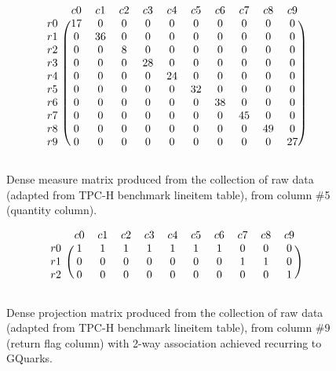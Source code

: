 

  \begin{figure}[H]
    \centering
    \caption{Dense measure matrix produced from the collection of raw data (adapted from TPC-H benchmark lineitem table), from column \#5 (quantity column).}
\[
\begin{blockarray}{ccccccccccc}
	&	c0	&	c1	&	c2	&	c3	&	c4	&	c5	&	c6	&	c7	&	c8	&	c9	\\
\begin{block}{c(cccccccccc)}
r0	&	17	&	0	&	0	&	0	&	0	&	0	&	0	&	0	&	0	&	0	\\
r1	&	0	&	36	&	0	&	0	&	0	&	0	&	0	&	0	&	0	&	0	\\
r2	&	0	&	0	&	8	&	0	&	0	&	0	&	0	&	0	&	0	&	0	\\
r3	&	0	&	0	&	0	&	28	&	0	&	0	&	0	&	0	&	0	&	0	\\
r4	&	0	&	0	&	0	&	0	&	24	&	0	&	0	&	0	&	0	&	0	\\
r5	&	0	&	0	&	0	&	0	&	0	&	32	&	0	&	0	&	0	&	0	\\
r6	&	0	&	0	&	0	&	0	&	0	&	0	&	38	&	0	&	0	&	0	\\
r7	&	0	&	0	&	0	&	0	&	0	&	0	&	0	&	45	&	0	&	0	\\
r8	&	0	&	0	&	0	&	0	&	0	&	0	&	0	&	0	&	49	&	0	\\
r9	&	0	&	0	&	0	&	0	&	0	&	0	&	0	&	0	&	0	&	27	\\
\end{block}
\end{blockarray}
 \]
    \label{fig:example_matrix_5}
    \end{figure}
        
\begin{figure}[H]
\centering
\caption{Dense projection matrix produced from the collection of raw data (adapted from TPC-H benchmark lineitem table), from column \#9 (return flag column) with 2-way association achieved recurring to GQuarks.}
\[
\begin{blockarray}{ccccccccccc}
	&	c0	&	c1	&	c2	&	c3	&	c4	&	c5	&	c6	&	c7	&	c8	&	c9	\\
\begin{block}{c(cccccccccc)}
r0	&	1	&	1	&	1	&	1	&	1	&	1	&	1	&	0	&	0	&	0	\\
r1	&	0	&	0	&	0	&	0	&	0	&	0	&	0	&	1	&	1	&	0	\\
r2	&	0	&	0	&	0	&	0	&	0	&	0	&	0	&	0	&	0	&	1	\\
\end{block}
\end{blockarray}
\]
    \label{fig:example_matrix_9}
\end{figure}

